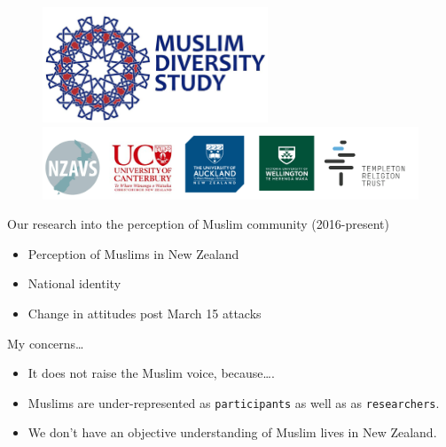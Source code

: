 \documentclass[
  ignorenonframetext,
  aspectratio=169,
]{beamer}
\providecommand{\tightlist}{%
  \setlength{\itemsep}{0pt}\setlength{\parskip}{0pt}}\usepackage{longtable,booktabs,array}
\begin{document}
\begin{frame}
\begin{figure}

\begin{minipage}{\linewidth}
\begin{center}
\includegraphics[width=0.6\textwidth,height=\textheight]{figs/mds.png}
\end{center}
\end{minipage}%
\newline
\begin{minipage}{\linewidth}
\includegraphics{figs/sponsors.png}\end{minipage}%

\end{figure}%
\end{frame}

\begin{frame}{Our research into the perception of Muslim community
(2016-present)}
\label{our-research-into-the-perception-of-muslim-community-2016-present}
\begin{itemize}[<+->]
\tightlist
\item
  Perception of Muslims in New Zealand
\item
  National identity
\item
  Change in attitudes post March 15 attacks
\end{itemize}
\end{frame}

\begin{frame}[fragile]{My concerns\ldots{}}
\label{my-concerns}
\begin{itemize}[<+->]
\tightlist
\item
  It does not raise the Muslim voice, because\ldots.
\item
  Muslims are under-represented as \texttt{participants} as well as as
  \texttt{researchers}.
\item
  We don't have an objective understanding of Muslim lives in New
  Zealand.
\end{itemize}
\end{frame}
\end{document}
